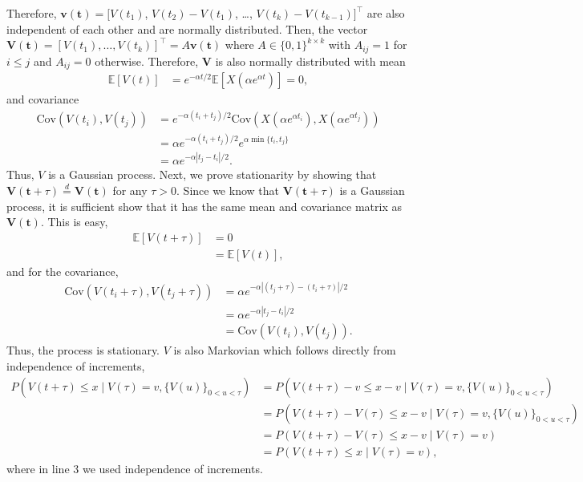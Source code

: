 \documentclass[11pt]{article}
\newcommand{\Cov}{\text{Cov}}
\newcommand{\E}{\mathbb{E}}
\newcommand{\abs}[1]{\left\lvert#1\right\rvert}
\begin{document}
\begin{enumerate}
Therefore, $\mathbf{v}(\mathbf{t}) = [V(t_1)$, $V(t_2) - V(t_1)$, \dots, $V(t_k) - V(t_{k-1})]^{\top}$ are also independent of each other and are normally distributed. Then, the vector $\mathbf{V}(\mathbf{t}) = [V(t_1), \dots, V(t_k)]^{\top} = A \mathbf{v}(\mathbf{t})$ where $A \in \{0,1\}^{k \times k}$ with $A_{ij} = 1$ for $i \leq j$ and $A_{ij} = 0$ otherwise. Therefore, $\mathbf{V}$ is also normally distributed with mean
\begin{align*}
	\E[V(t)] &= e^{-\alpha t / 2} \E[X(\alpha e^{\alpha t})] = 0,
\end{align*}
and covariance
\begin{align*}
	\Cov(V(t_i), V(t_j)) &= e^{-\alpha(t_i + t_j) / 2} \Cov(X( \alpha e^{\alpha t_i}), X(\alpha e^{\alpha t_j})) \\
	&= \alpha e^{-\alpha(t_i + t_j) / 2} e^{\alpha \min\{t_i, t_j\}} \\
	&= \alpha e^{- \alpha \abs{t_j - t_i} / 2}.
\end{align*}
Thus, $V$ is a Gaussian process. Next, we prove stationarity by showing that $\mathbf{V}(\mathbf{t} + \tau) \stackrel{d}{=} \mathbf{V}(\mathbf{t})$ for any $\tau > 0$. Since we know that $\mathbf{V}(\mathbf{t} + \tau)$ is a Gaussian process, it is sufficient show that it has the same mean and covariance matrix as $\mathbf{V}(\mathbf{t})$. This is easy,
\begin{align*}
	\E[V(t + \tau)] &= 0 \\
	&= \E[V(t)],
\end{align*}
and for the covariance,
\begin{align*}
	\Cov(V(t_i + \tau), V(t_j + \tau)) &= \alpha  e^{- \alpha \abs{(t_j + \tau) - (t_i + \tau)} / 2} \\
	&= \alpha  e^{- \alpha \abs{t_j - t_i} / 2} \\
	&= \Cov(V(t_i), V(t_j)).
\end{align*}
Thus, the process is stationary. $V$ is also Markovian which follows directly from independence of increments,
\begin{align*}
	P(V(t + \tau) \leq x \mid V(\tau) = v, \{V(u)\}_{0 < u < \tau}) &= P(V(t + \tau) - v \leq x - v \mid V(\tau) = v, \{V(u)\}_{0 < u < \tau}) \\
	&= P(V(t + \tau) - V(\tau) \leq x - v \mid V(\tau) = v, \{V(u)\}_{0 < u < \tau}) \\
	&= P(V(t + \tau) - V(\tau) \leq x - v \mid V(\tau) = v) \\
	&= P(V(t + \tau) \leq x \mid V(\tau) = v),
\end{align*}
where in line 3 we used independence of increments.


\end{enumerate}
\end{document}

